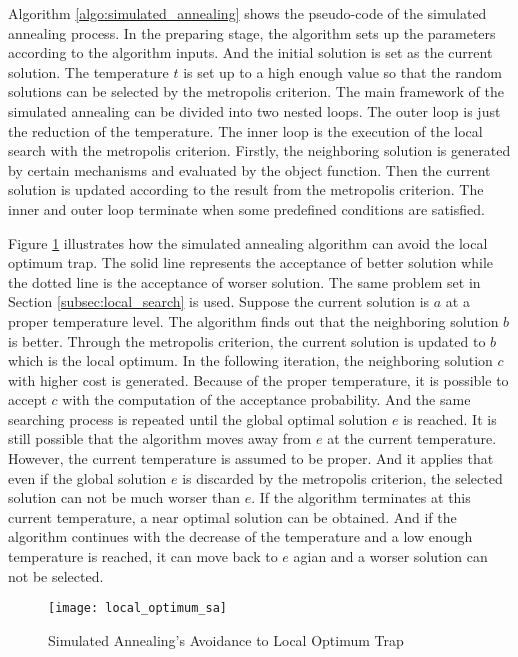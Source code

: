 		
		
		Algorithm \ref{algo:simulated_annealing} shows the pseudo-code of the simulated
		annealing process. In the preparing stage, the algorithm sets up the parameters
		according to the algorithm inputs. And the initial solution is set as the current
		solution. The temperature $t$ is set up to a high enough value so that the random
		solutions can be selected by the metropolis criterion. The main framework of the
		simulated annealing can be divided into two nested loops. The outer loop is just the
		reduction of the temperature.
		The inner loop is the execution of the local search with the metropolis criterion.
		Firstly, the neighboring solution is generated by certain mechanisms and evaluated by the
		object function. Then the current solution is updated according to the result from
		the metropolis criterion.
		The inner and outer loop terminate when some predefined conditions are satisfied.

		Figure \ref{fig:local_optimum_sa} illustrates how the simulated annealing algorithm
		can avoid the local optimum trap. The solid line represents the acceptance of better
		solution while the dotted line is the acceptance of worser solution.
		The same problem set in Section \ref{subsec:local_search} is used.
		Suppose the current solution is $a$ at a proper temperature level. The algorithm finds out
		that the neighboring solution $b$ is better. Through the metropolis criterion, the current
		solution is updated to $b$ which is the local optimum. In the following iteration, the 
		neighboring solution $c$ with higher cost is generated. Because of the proper
		temperature, it is possible to accept $c$ with the computation of the acceptance probability.
		And the same searching process is repeated until the global optimal solution $e$ is reached.
		It is still possible that the algorithm moves away from $e$ at the current temperature.
		However, the current temperature is assumed to be proper. And it applies that even if the
		global solution $e$ is discarded by the metropolis criterion, the selected solution can not
		be much worser than $e$. If the algorithm terminates at this current temperature, a near
		optimal solution can be obtained. And if the algorithm continues with the decrease of
		the temperature and a low enough temperature is reached, it can move back to $e$ agian
		and a worser solution can not be selected.
		\begin{figure}[htb]
			\begin{center}
				\texttt{[image: local\_optimum\_sa]}
				\caption{Simulated Annealing's Avoidance to Local Optimum Trap}
				\label{fig:local_optimum_sa}
			\end{center}
		\end{figure}
	\newpage
